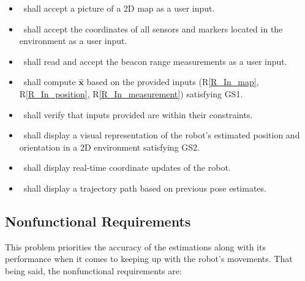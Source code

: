 \documentclass[12pt]{article}
\newcounter{reqnum} %
\newcommand{\rref}[1]{R\ref{#1}}
\begin{document}
\noindent\begin{itemize}

\item[R\refstepcounter{reqnum}\thereqnum\label{R_In_map}:] \progname~shall accept a picture of a 2D map as a user input.

\item[R\refstepcounter{reqnum}\thereqnum\label{R_In_position}:] \progname~shall accept the coordinates of all sensors and markers located in the environment as a user input.

\item[R\refstepcounter{reqnum}\thereqnum\label{R_In_measurement}:] \progname~shall read and accept the beacon range measurements as a user input.

\item[R\refstepcounter{reqnum}\thereqnum\label{R_Calculate}:] \progname~shall compute $\mathbf{\hat{x}}$ based on the provided inputs (\rref{R_In_map}, \rref{R_In_position}, \rref{R_In_measurement}) satisfying GS1.

\item[R\refstepcounter{reqnum}\thereqnum\label{R_VerifyOutput}:] \progname~shall verify that inputs provided are within their constraints.

\item[R\refstepcounter{reqnum}\thereqnum\label{R_Out_Visual}:] \progname~shall display a visual representation of the robot’s estimated position and orientation in a 2D environment satisfying GS2.

\item[R\refstepcounter{reqnum}\thereqnum\label{R_Out_Coordinates}:] \progname~shall display real-time coordinate updates of the robot.

\item[R\refstepcounter{reqnum}\thereqnum\label{R_Out_Trajectory}:] \progname~shall display a trajectory path based on previous pose estimates.

\end{itemize}

\subsection{Nonfunctional Requirements}

This problem priorities the accuracy of the estimations along with its performance when it comes to keeping up with the robot's movements. That being said, the nonfunctional requirements are:
\end{document}
